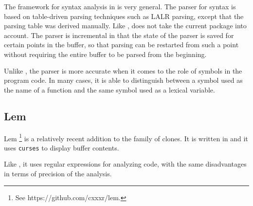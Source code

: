 The framework for syntax analysis in \climacs{}
\cite{Rhodes.etal:2005} is very general.  The parser for \commonlisp{}
syntax is based on table-driven parsing techniques such as LALR
parsing, except that the parsing table was derived manually.  Like
\emacs{}, \climacs{} does not take the current package into account.
The parser is incremental in that the state of the parser is saved for
certain points in the buffer, so that parsing can be restarted from
such a point without requiring the entire buffer to be parsed from the
beginning.

Unlike \emacs{}, the \climacs{} parser is more accurate when it comes
to the role of symbols in the program code.  In many cases, it is able
to distinguish between a symbol used as the name of a function and the
same symbol used as a lexical variable.

\subsection{Lem}

Lem%
\footnote{See https://github.com/cxxxr/lem.}
is a relatively recent addition to the family of \emacs{} clones.  It
is written in \commonlisp{} and it uses \texttt{curses} to display
buffer contents.

Like \emacs{} , it uses regular expressions
for analyzing \commonlisp{} code, with the same disadvantages in terms
of precision of the analysis.

